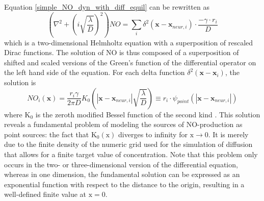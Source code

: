 \documentclass[10pt,a4paper]{article}
\begin{document}
Equation \eqref{simple_NO_dyn_with_diff_equil} can be rewritten as
\begin{equation}
\left(\nabla^2 + \left( i\sqrt{\frac{\lambda}{D}}\right)^2\right) NO = \sum_{i} \delta^2(\mathbf{x}-\mathbf{x}_{neur,i})\cdot \frac{- \gamma \cdot r_i}{D}
\label{simple_NO_dyn_with_diff_equil_helmholtz}
\end{equation}
which is a two-dimensional Helmholtz equation with a superposition of rescaled Dirac functions. The solution of $\mathrm{NO}$ is thus composed of a superposition of shifted and scaled versions of the Green's function of the differential operator on the left hand side of the equation. For each delta function $\delta^2(\mathbf{x}-\mathbf{x}_i)$, the solution is
\begin{equation}
NO_i(\mathbf{x}) = \frac{r_i \gamma}{2 \pi D} K_0 \left(|\mathbf{x}-\mathbf{x}_{neur,i}|\sqrt{\frac{\lambda}{D}} \right) \equiv r_i \cdot \psi_{point}(|\mathbf{x}-\mathbf{x}_{neur,i}|)
\label{solution_diff_equil_bessel}
\end{equation}
where $\mathrm{K_0}$ is the zeroth modified Bessel function of the second kind \cite{Helmholtz_Solution_2d}. This solution reveals a fundamental problem of modeling the sources of NO-production as point sources: the fact that $\mathrm{K_0(x)}$ diverges to infinity for $\mathrm{x\rightarrow 0}$. It is merely due to the finite density of the numeric grid used for the simulation of diffusion that allows for a finite target value of concentration. Note that this problem only occurs in the two- or three-dimensional version of the differential equation, whereas in one dimension, the fundamental solution can be expressed as an exponential function with respect to the distance to the origin, resulting in a well-defined finite value at $\mathrm{x=0}$.
\end{document}
